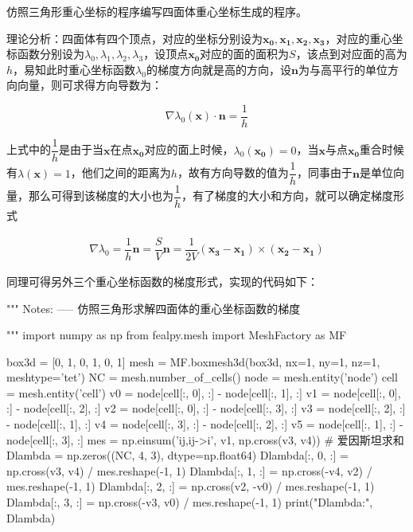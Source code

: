 \documentclass{article}
\begin{document}
仿照三角形重心坐标的程序编写四面体重心坐标生成的程序。

理论分析：四面体有四个顶点，对应的坐标分别设为$\pmb{x_0},\pmb{x_1},\pmb{x_2},\pmb{x_3}$，对应的重心坐标函数分别设为$\lambda_0,\lambda_1,\lambda_2,\lambda_3$，设顶点$\pmb{x_0}$对应的面的面积为$S$，该点到对应面的高为$h$，易知此时重心坐标函数$\lambda_0$的梯度方向就是高的方向，设$\pmb{n}$为与高平行的单位方向向量，则可求得方向导数为：

\begin{equation*}
    \nabla \lambda_0(\pmb{x})\cdot\pmb{n}=\dfrac{1}{h}
\end{equation*}

上式中的$\dfrac{1}{h}$是由于当$\pmb{x}$在点$\pmb{x_0}$对应的面上时候，$\lambda_0(\pmb{x_0})=0$，当$\pmb{x}$与点$\pmb{x_0}$重合时候有$\lambda(\pmb{x})=1$，他们之间的距离为$h$，故有方向导数的值为$\dfrac{1}{h}$，同事由于$\pmb{n}$是单位向量，那么可得到该梯度的大小也为$\dfrac{1}{h}$，有了梯度的大小和方向，就可以确定梯度形式

\begin{align*}
    \nabla\lambda_0 = \dfrac{1}{h}\pmb{n} 
                    =\dfrac{S}{V}\pmb{n}  
                    =\dfrac{1}{2V}(\pmb{x_3}-\pmb{x_1})\times(\pmb{x_2}-\pmb{x_1})
\end{align*}

同理可得另外三个重心坐标函数的梯度形式，实现的代码如下：

\begin{python}
"""
Notes:
-----
仿照三角形求解四面体的重心坐标函数的梯度

"""
import numpy as np
from fealpy.mesh import MeshFactory as MF

box3d = [0, 1, 0, 1, 0, 1]
mesh = MF.boxmesh3d(box3d, nx=1, ny=1, nz=1, meshtype='tet')
NC = mesh.number_of_cells()
node = mesh.entity('node')
cell = mesh.entity('cell')
v0 = node[cell[:, 0], :] - node[cell[:, 1], :]
v1 = node[cell[:, 0], :] - node[cell[:, 2], :]
v2 = node[cell[:, 0], :] - node[cell[:, 3], :]
v3 = node[cell[:, 2], :] - node[cell[:, 1], :]
v4 = node[cell[:, 3], :] - node[cell[:, 2], :]
v5 = node[cell[:, 1], :] - node[cell[:, 3], :]
mes = np.einsum('ij,ij->i', v1, np.cross(v3, v4))  # 爱因斯坦求和
Dlambda = np.zeros((NC, 4, 3), dtype=np.float64)
Dlambda[:, 0, :] = np.cross(v3, v4) / mes.reshape(-1, 1)
Dlambda[:, 1, :] = np.cross(-v4, v2) / mes.reshape(-1, 1)
Dlambda[:, 2, :] = np.cross(v2, -v0) / mes.reshape(-1, 1)
Dlambda[:, 3, :] = np.cross(-v3, v0) / mes.reshape(-1, 1)
print("Dlambda:", Dlambda)
\end{python}
\end{document}
